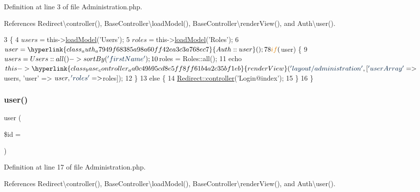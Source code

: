 Definition at line 3 of file Administration.\+php.



References Redirect\textbackslash{}controller(), Base\+Controller\textbackslash{}load\+Model(), Base\+Controller\textbackslash{}render\+View(), and Auth\textbackslash{}user().


\begin{DoxyCode}
3                             \{
4         $users = $this->\hyperlink{class_base_controller_a5fa8890bd3a9d20f5c0cc2377dc49eb1}{loadModel}(\textcolor{stringliteral}{'Users'});
5         $roles = $this->\hyperlink{class_base_controller_a5fa8890bd3a9d20f5c0cc2377dc49eb1}{loadModel}(\textcolor{stringliteral}{'Roles'});
6         $user = \hyperlink{class_auth_a7949f68385a98a60ff42ea3c3a768ec7}{Auth::user}();
7 
8         \textcolor{keywordflow}{if} ($user) \{
9             $users = Users::all()->sortBy(\textcolor{stringliteral}{'firstName'});
10             $roles = Roles::all();
11             echo $this->\hyperlink{class_base_controller_aa0c49b95cd8e5ff8ff61b4a2c35bf1eb}{renderView}(\textcolor{stringliteral}{'layout/administration'}, [\textcolor{stringliteral}{'userArray'} => $users, \textcolor{stringliteral}{'user'} => 
      $user, \textcolor{stringliteral}{'roles'} => $roles]);
12         \}
13         \textcolor{keywordflow}{else} \{
14             \hyperlink{class_redirect_ab7d0d268b6aaa9a5470b7cb8c7eb1b61}{Redirect::controller}(\textcolor{stringliteral}{'Login@index'});
15         \}
16     \}
\end{DoxyCode}
\hypertarget{class_administration_a6603546e99f9519b86989be128736ad6}{}\label{class_administration_a6603546e99f9519b86989be128736ad6} 
\subsubsection{\texorpdfstring{user()}{user()}}
{\footnotesize\ttfamily user (\begin{DoxyParamCaption}\item[{}]{\$id = {\ttfamily \textquotesingle{}\textquotesingle{}} }\end{DoxyParamCaption})}



Definition at line 17 of file Administration.\+php.



References Redirect\textbackslash{}controller(), Base\+Controller\textbackslash{}load\+Model(), Base\+Controller\textbackslash{}render\+View(), and Auth\textbackslash{}user().


